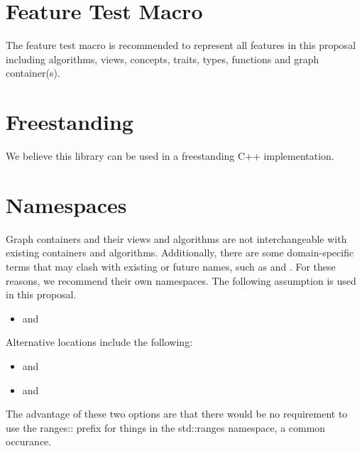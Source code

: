 \section{Feature Test Macro}
The  feature test macro is recommended to represent all features in this proposal including algorithms, views, concepts, traits, types, functions and graph container(s).

\section{Freestanding}
We believe this library can be used in a freestanding C++ implementation.

\section{Namespaces}
Graph containers and their views and algorithms are not interchangeable with existing containers and algorithms.
Additionally, there are some domain-specific terms that may clash with existing or future names, such as 
 and .
For these reasons, we recommend their own namespaces. The following assumption is used in this proposal.
\begin{itemize}
\item[] and 
\end{itemize}

\noindent
Alternative locations include the following:
\begin{itemize}
\item[] and 
\item[] and 
\end{itemize}
The advantage of these two options are that there would be no requirement to use the ranges:: prefix for things
in the std::ranges namespace, a common occurance.

